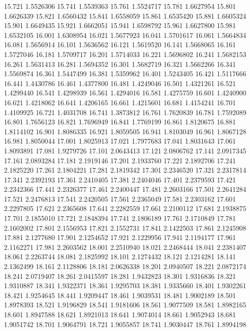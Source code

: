 15.721 1.5526306
15.741 1.5539363
15.761 1.5524717
15.781 1.6627954
15.801 1.6626339
15.821 1.6560432
15.841 1.6558059
15.861 1.6535420
15.881 1.6605324
15.901 1.6649435
15.921 1.6662051
15.941 1.6598792
15.961 1.6627800
15.981 1.6532105
16.001 1.6308954
16.021 1.5677923
16.041 1.5701617
16.061 1.5664834
16.081 1.5656914
16.101 1.5636562
16.121 1.5619520
16.141 1.5668065
16.161 1.5727046
16.181 1.5709717
16.201 1.5714033
16.221 1.5696802
16.241 1.5682153
16.261 1.5631413
16.281 1.5694352
16.301 1.5682719
16.321 1.5662266
16.341 1.5569874
16.361 1.5447499
16.381 1.5359962
16.401 1.5243405
16.421 1.5117666
16.441 1.4430786
16.461 1.4377800
16.481 1.4249046
16.501 1.4321261
16.521 1.4299440
16.541 1.4298939
16.561 1.4294016
16.581 1.4275759
16.601 1.4240900
16.621 1.4218062
16.641 1.4206165
16.661 1.4215601
16.681 1.4154241
16.701 1.4109925
16.721 1.4031708
16.741 1.3873812
16.761 1.7620839
16.781 1.7592089
16.801 1.7656123
16.821 1.7696949
16.841 1.7769199
16.861 1.8120675
16.881 1.8114102
16.901 1.8086335
16.921 1.8059505
16.941 1.8103049
16.961 1.8067128
16.981 1.8050044
17.001 1.8025913
17.021 1.7977683
17.041 1.8031643
17.061 1.8093891
17.081 1.9279726
17.101 2.0643413
17.121 2.0806762
17.141 2.0917345
17.161 2.0893284
17.181 2.1919146
17.201 2.1933760
17.221 2.1892706
17.241 2.1825220
17.261 2.1804221
17.281 2.1819342
17.301 2.2346520
17.321 2.2317814
17.341 2.2392193
17.361 2.2410405
17.381 2.2404046
17.401 2.2379593
17.421 2.2342366
17.441 2.2326377
17.461 2.2400447
17.481 2.2603166
17.501 2.2641284
17.521 2.2476813
17.541 2.2420505
17.561 2.2365049
17.581 2.2303162
17.601 2.2297805
17.621 2.2365608
17.641 2.2282559
17.661 2.2100112
17.681 2.1938875
17.701 2.1855010
17.721 2.1848394
17.741 2.1806189
17.761 2.1710849
17.781 2.1602002
17.801 2.1556953
17.821 2.1552731
17.841 2.1422503
17.861 2.1245908
17.881 2.1277680
17.901 2.1254652
17.921 2.1229956
17.941 2.1194177
17.961 2.1162271
17.981 2.2603562
18.001 2.2510940
18.021 2.2468444
18.041 2.2381407
18.061 2.2263744
18.081 2.1825992
18.101 2.1274432
18.121 2.1214281
18.141 2.1362499
18.161 2.1128806
18.181 2.0626338
18.201 2.0940507
18.221 2.0872174
18.241 2.0719407
18.261 2.0415597
18.281 1.9432823
18.301 1.9316836
18.321 1.9310887
18.341 1.9322371
18.361 1.9295703
18.381 1.9335660
18.401 1.9302261
18.421 1.9254645
18.441 1.9209447
18.461 1.9039531
18.481 1.9002189
18.501 1.8978393
18.521 1.9196829
18.541 1.9181606
18.561 1.9077509
18.581 1.8982165
18.601 1.8947588
18.621 1.8921013
18.641 1.9074014
18.661 1.9052943
18.681 1.9051742
18.701 1.9064791
18.721 1.9055857
18.741 1.9030447
18.761 1.8994198
